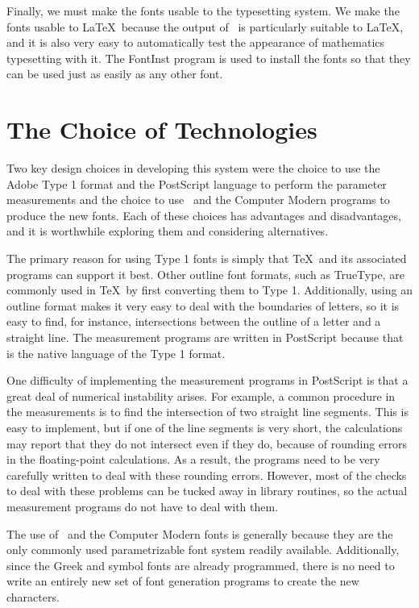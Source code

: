 \documentclass[12pt]{article}
\begin{document}
Finally, we must make the fonts usable to the typesetting system. We make the
fonts usable to \LaTeX\ because the output of \MF\ is particularly suitable to
\LaTeX, and it is also very easy to automatically test the appearance of
mathematics typesetting with it. The FontInst program is used to install the
fonts so that they can be used just as easily as any other font.

\section{The Choice of Technologies}

Two key design choices in developing this system were the choice to use the
Adobe Type 1 format and the PostScript language to perform the parameter
measurements and the choice to use \MF\ and the Computer Modern programs to
produce the new fonts. Each of these choices has advantages and disadvantages,
and it is worthwhile exploring them and considering alternatives.

The primary reason for using Type 1 fonts is simply that \TeX\ and its
associated programs can support it best. Other outline font formats, such as
TrueType, are commonly used in \TeX\ by first converting them to Type 1.
Additionally, using an outline format makes it very easy to deal with the
boundaries of letters, so it is easy to find, for instance, intersections
between the outline of a letter and a straight line. The measurement programs
are written in PostScript because that is the native language of the Type 1
format.

One difficulty of implementing the measurement programs in PostScript is that a
great deal of numerical instability arises. For example, a common procedure in
the measurements is to find the intersection of two straight line segments. This
is easy to implement, but if one of the line segments is very short, the
calculations may report that they do not intersect even if they do, because of
rounding errors in the floating-point calculations. As a result, the programs
need to be very carefully written to deal with these rounding errors. However,
most of the checks to deal with these problems can be tucked away in library
routines, so the actual measurement programs do not have to deal with them.

The use of \MF\ and the Computer Modern fonts is generally because they are the
only commonly used parametrizable font system readily available. Additionally,
since the Greek and symbol fonts are already programmed, there is no need to
write an entirely new set of font generation programs to create the new
characters.
\end{document}

